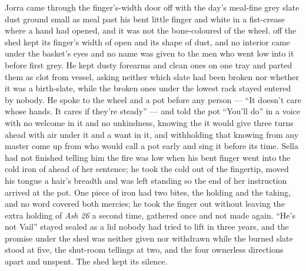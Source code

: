 Jorra came through the finger's-width door off  with the day's meal-fine grey slate dust ground small as meal past his bent little finger and white in a fist-crease where a hand had opened, and it was not the bone-coloured  of the wheel.  off the shed kept its finger's width of open and its shape of dust, and no interior came under the basket's eyes and no name was given to the men who went low into it before first grey. He kept dusty forearms and clean ones on one tray and parted them as clot from vessel, asking neither which slate had been broken nor whether it was a birth-slate, while the broken ones under the lowest rack stayed entered by nobody. He spoke to the wheel and a pot before any person --- “It doesn't care whose hands. It cares if they're steady” --- and told the pot “You'll do” in a voice with no welcome in it and no unkindness, knowing the  it would give three turns ahead with air under it and a want in it, and withholding that knowing from any master come up from  who would call a pot early and sing it before its time. Sella had not finished telling him the fire was low when his bent finger went into the cold iron of  ahead of her sentence; he took the cold out of the fingertip, moved his tongue a hair's breadth and was left standing so the end of her instruction arrived at the pot. One piece of iron had two bites, the holding and the taking, and no  word covered both mercies; he took the finger out without leaving the extra holding of \emph{Ash 26} a second time, gathered once and not made again. “He's not Vail” stayed sealed as a lid nobody had tried to lift in three years, and the promise under the shed was neither given nor withdrawn while the burned slate stood at five, the shut-room tellings at two, and the four ownerless directions apart and unspent. The shed kept its silence.

